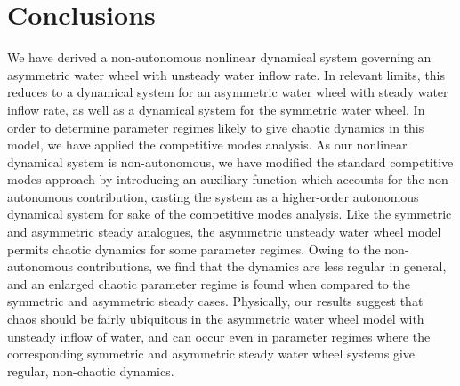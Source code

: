 \section{Conclusions} \label{sec:conc}
We have derived a non-autonomous nonlinear dynamical system governing an asymmetric water wheel with unsteady water inflow rate. In relevant limits, this reduces to a dynamical system for an asymmetric water wheel with steady water inflow rate, as well as a dynamical system for the symmetric water wheel. In order to determine parameter regimes likely to give chaotic dynamics in this model, we have applied the competitive modes analysis. As our nonlinear dynamical system is non-autonomous, we have modified the standard competitive modes approach by introducing an auxiliary function which accounts for the non-autonomous contribution, casting the system as a higher-order autonomous dynamical system for sake of the competitive modes analysis. Like the symmetric and asymmetric steady analogues, the asymmetric unsteady water wheel model permits chaotic dynamics for some parameter regimes. Owing to the non-autonomous contributions, we find that the dynamics are less regular in general, and an enlarged chaotic parameter regime is found when compared to the symmetric and asymmetric steady cases. Physically, our results suggest that chaos should be fairly ubiquitous in the asymmetric water wheel model with unsteady inflow of water, and can occur even in parameter regimes where the corresponding symmetric and asymmetric steady water wheel systems give regular, non-chaotic dynamics. 


